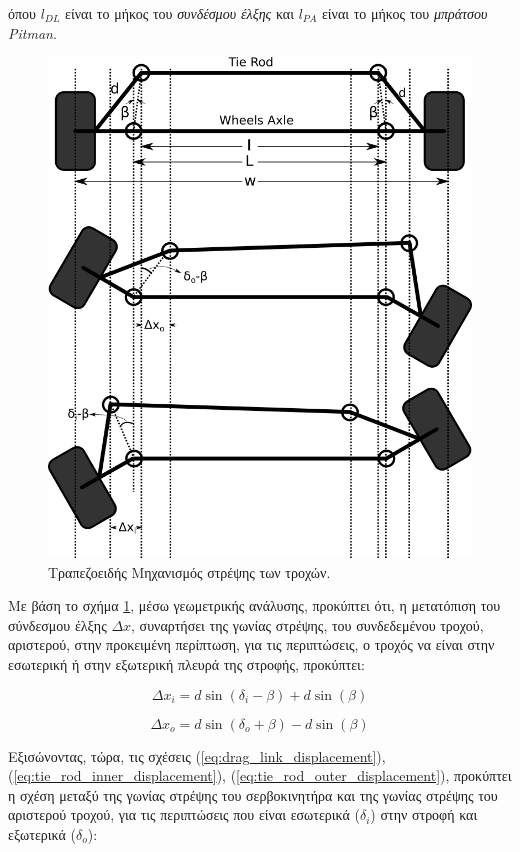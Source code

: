 \bigskip\noindent
όπου $l_{DL}$ είναι το μήκος του \textit{συνδέσμου έλξης} και $l_{PA}$ είναι το μήκος του \textit{μπράτσου Pitman}.

\begin{figure}[!ht]
	\centering
	\includegraphics[width=0.8\linewidth]{Chapters/Chapter2/Figures/trapezoid_steering_mechanism.png}
	\caption{Τραπεζοειδής Μηχανισμός στρέψης των τροχών.}
	\label{fig:trapezoid_steering_mechanism}
\end{figure}

\bigskip
Με βάση το σχήμα \ref{fig:trapezoid_steering_mechanism}, μέσω γεωμετρικής ανάλυσης, προκύπτει ότι, η μετατόπιση του σύνδεσμου έλξης $\Delta x$, συναρτήσει της γωνίας στρέψης, του συνδεδεμένου τροχού, αριστερού, στην προκειμένη περίπτωση, για τις περιπτώσεις, ο τροχός να είναι στην εσωτερική ή στην εξωτερική  πλευρά της στροφής, προκύπτει:
 
\begin{equation}
\label{eq:tie_rod_inner_displacement}
	\Delta x_i = d \sin(\delta_i - \beta) + d \sin(\beta)
\end{equation}

\begin{equation}
	\label{eq:tie_rod_outer_displacement}
	\Delta x_o = d \sin(\delta_o + \beta) - d \sin(\beta)
\end{equation}

\bigskip
Εξισώνοντας, τώρα, τις σχέσεις (\ref{eq:drag_link_displacement}), (\ref{eq:tie_rod_inner_displacement}), (\ref{eq:tie_rod_outer_displacement}), προκύπτει η σχέση μεταξύ της γωνίας στρέψης του σερβοκινητήρα και της γωνίας στρέψης του αριστερού τροχού, για τις περιπτώσεις που είναι εσωτερικά ($\delta_i$) στην στροφή και εξωτερικά ($\delta_o$):

